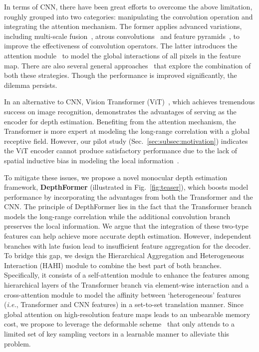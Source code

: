 \documentclass[twocolumn]{svjour3}    \pdfoutput=1
\begin{document}
In terms of CNN, there have been great efforts to overcome the above limitation, roughly grouped into two categories: manipulating the convolution operation and integrating the attention mechanism. The former applies  advanced variations, including multi-scale fusion~\citep{ronneberger2015u}, atrous convolutions~\citep{chen2017deeplab} and feature pyramids~\citep{zhao2017pyramid}, to improve the effectiveness of convolution operators. The latter introduces the attention module~\citep{vaswani2017transformer} to model the global interactions of all pixels in the feature map. There are also several general approaches~\citep{fu2018deep, lee2019bts, huynh2020guiding, bhat2021adabins} that explore the combination of both these strategies. Though the performance is improved significantly, the dilemma persists.

In an alternative to CNN, Vision Transformer (ViT)~\citep{dosovitskiy2020vit}, which achieves tremendous success on image recognition, demonstrates the advantages of serving as the encoder for depth estimation. Benefiting from the attention mechanism, the Transformer is more expert at modeling the long-range correlation with a global receptive field. However, our pilot study (Sec.~\ref{sec:subsec:motivation}) indicates the ViT encoder cannot produce satisfactory performance due to the lack of spatial inductive bias in modeling the local information~\citep{yang2021transdepth}.

To mitigate these issues, we propose a novel monocular depth estimation framework, \textbf{DepthFormer} (illustrated in Fig.~\ref{fig:teaser}), which boosts model performance by incorporating the advantages from both the Transformer and the CNN. The principle of DepthFormer lies in the fact that the Transformer branch models the long-range correlation while the additional convolution branch preserves the local information. We argue that the integration of these two-type features can help achieve more accurate depth estimation. However, independent branches with late fusion lead to insufficient feature aggregation for the decoder. To bridge this gap, we design the Hierarchical Aggregation and Heterogeneous Interaction (HAHI) module to combine the best part of both branches. Specifically, it consists of a self-attention module to enhance the features among hierarchical layers of the Transformer branch via element-wise interaction and a cross-attention module to model the affinity between `heterogeneous' features (\textit{i.e.}, Transformer and CNN features) in a set-to-set translation manner. Since global attention on high-resolution feature maps leads to an unbearable memory cost, we propose to leverage the deformable scheme~\citep{dai2017deformable,zhu2020deformabledetr} that only attends to a limited set of key sampling vectors in a learnable manner to alleviate this problem.
\end{document}
